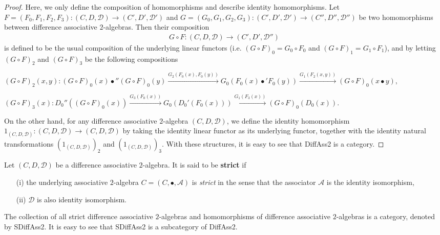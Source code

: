 \documentclass[a4paper,reqno,10pt]{amsart}
\theoremstyle{plain}
\theoremstyle{definition}
\theoremstyle{remark}
\begin{document}
\begin{proof}
    Here, we only define the composition of homomorphisms and describe identity homomorphisms. Let $F = (F_0, F_1, F_2, F_3) : (C, D, \mathcal{D}) \rightarrow (C', D', \mathcal{D}')$ and $G = (G_0, G_1, G_2, G_3) : (C', D', \mathcal{D}') \rightarrow (C'', D'', \mathcal{D}'')$ be two homomorphisms between difference associative $2$-algebras. Then their composition 
    \begin{align*}
    G \circ F : (C, D, \mathcal{D}) \rightarrow (C', D', \mathcal{D}'')
    \end{align*}
    is defined to be the usual composition of the underlying linear functors (i.e. $(G \circ F)_0 = G_0 \circ F_0$ and $(G \circ F)_1 = G_1 \circ F_1$), and by letting $(G \circ F)_2$ and $(G \circ F)_3$ be the following compositions
    \begin{center}
        $(G \circ F)_2 (x, y) : (G \circ F)_0 (x) \bullet'' (G \circ F)_0 (y) \xrightarrow{ G_2 (F_0 (x), F_0 (y))} G_0 ( F_0 (x) \bullet'F_0 (y) ) \xrightarrow{ G_1 (F_2 (x, y) )} (G \circ F)_0 (x \bullet y),$ 
        \end{center}
        \begin{center}
       $ (G \circ F)_3 (x) : D_0'' ( (G \circ F)_0 (x)) \xrightarrow{ G_3 (F_0 (x))} G_0 (D_0' (F_0 (x))) \xrightarrow{ G_1 (F_3 (x))} (G \circ F)_0 (D_0 (x)).$
    \end{center}
    On the other hand, for any difference associative $2$-algebra $(C, D, \mathcal{D})$, we define the identity homomorphism $1_{ (C, D, \mathcal{D})} : (C, D, \mathcal{D}) \rightarrow (C, D, \mathcal{D})$ by taking the identity linear functor as its underlying functor, together with the identity natural transformations  $(1_{ (C, D, \mathcal{D})} )_2$ and  $(1_{ (C, D, \mathcal{D})} )_3$. With these structures, it is easy to see that {\sf DiffAss2} is a category.
\end{proof}

Let $( C, D, \mathcal{D})$ be a difference associative $2$-algebra. It is said to be {\bf strict} if
\begin{itemize}
    \item[(i)] the underlying associative $2$-algebra $C = (C, \bullet, \mathcal{A})$ is {\em strict} in the sense that the associator $\mathcal{A}$ is the identity isomorphism,
    \item[(ii)] $\mathcal{D}$ is also identity isomorphism.
\end{itemize}
The collection of all strict difference associative $2$-algebras and homomorphisms of difference associative $2$-algebras is a category, denoted by {\sf SDiffAss2}. It is easy to see that {\sf SDiffAss2} is a subcategory of {\sf DiffAss2}.
\end{document}
